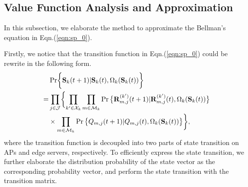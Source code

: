 \subsection{Value Function Analysis and Approximation}

In this subsection, we elaborate the method to approximate the Bellman's equation in Eqn.(\ref{eqn:sp_0}).

Firstly, we notice that the transition function in Eqn.(\ref{eqn:sp_0}) could be rewrite in the following form.
\begin{align}
    & \Pr\Brace{ \Stat_{k}(t+1)|\Stat_{k}(t), \Omega_{k}(\Stat_{k}(t)) }
    \nonumber\\
    =& \prod_{j\in\jSpace} \Brace{
        \prod_{k'\in\ccSet_{k}}\prod_{m\in\esSet_{k}} \Pr\big\{
            \vec{R}^{(k')}_{m,j}(t+1) | \vec{R}^{(k')}_{m,j}(t), \Omega_{k}(\Stat_{k}(t))
        \big\}
        \nonumber\\
        &\times \prod_{m\in\esSet_{k}} \Pr\big\{
            Q_{m,j}(t+1) | Q_{m,j}(t), \Omega_{k}(\Stat_{k}(t))
        \big\}
    },
\end{align}
where the transition function is decoupled into two parts of state transition on APs and edge servers, respectively.
To efficiently express the state transition, we further elaborate the distribution probability of the state vector as the corresponding probability vector, and perform the state transition with the transition matrix.

